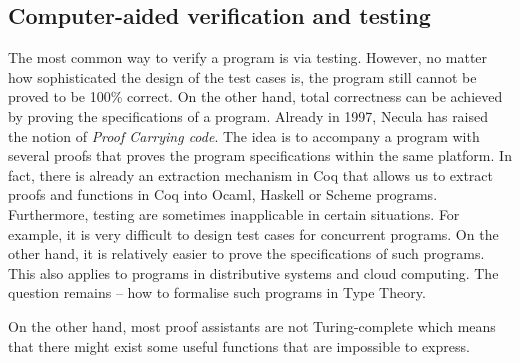 \par 


\subsection{Computer-aided verification and testing}
\par The most common way to verify a program is via testing. However,
no matter how sophisticated the design of the test cases is, the
program still cannot be proved to be 100\% correct. On the other
hand, total correctness can be achieved by proving the specifications
of a program. Already in 1997, Necula \cite{necula1997} has raised the
notion of \textit{Proof Carrying code}. The idea is to accompany
a program with several proofs that proves the program specifications
within the same platform. In fact, there is already an
extraction mechanism \cite{letouzey2008} in Coq that allows us to
extract proofs and functions in Coq into Ocaml, Haskell or Scheme
programs. Furthermore, testing are sometimes inapplicable in certain
situations. For example, it is very difficult to design test cases for
concurrent programs. On the other hand, it is relatively easier to prove the
specifications of such programs. This also applies to programs in
distributive systems and cloud computing. The question remains -- how
to formalise such programs in Type Theory. 

\par On the other hand, most proof assistants are not Turing-complete
which means that there might exist some useful functions that are
impossible to express. 